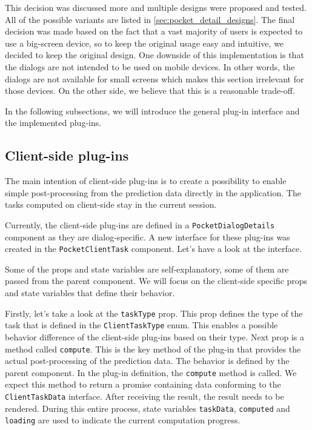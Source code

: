 This decision was discussed more and multiple designs were proposed and tested. All of the possible variants are listed in \cref{sec:pocket_detail_designs}. The final decision was made based on the fact that a vast majority of users is expected to use a big-screen device, so to keep the original usage easy and intuitive, we decided to keep the original design. One downside of this implementation is that the dialogs are not intended to be used on mobile devices. In other words, the dialogs are not available for small screens which makes this section irrelevant for those devices. On the other side, we believe that this is a reasonable trade-off.

In the following subsections, we will introduce the general plug-in interface and the implemented plug-ins.

\subsection{Client-side plug-ins}
\label{subsec:client-side-plugins}

The main intention of client-side plug-ins is to create a possibility to enable simple post-processing from the prediction data directly in the application. The tasks computed on client-side stay in the current session. 

Currently, the client-side plug-ins are defined in a \texttt{PocketDialogDetails} component as they are dialog-specific. A new interface for these plug-ins was created in the \texttt{PocketClientTask} component. Let's have a look at the interface.



Some of the props and state variables are self-explanatory, some of them are passed from the parent component. We will focus on the client-side specific props and state variables that define their behavior.

Firstly, let's take a look at the \texttt{taskType} prop. This prop defines the type of the task that is defined in the \texttt{ClientTaskType} enum. This enables a possible behavior difference of the client-side plug-ins based on their type. Next prop is a method called \texttt{compute}. This is the key method of the plug-in that provides the actual post-processing of the prediction data. The behavior is defined by the parent component. In the plug-in definition, the \texttt{compute} method is called. We expect this method to return a promise containing data conforming to the \texttt{ClientTaskData} interface. After receiving the result, the result needs to be rendered. During this entire process, state variables \texttt{taskData}, \texttt{computed} and \texttt{loading} are used to indicate the current computation progress.

